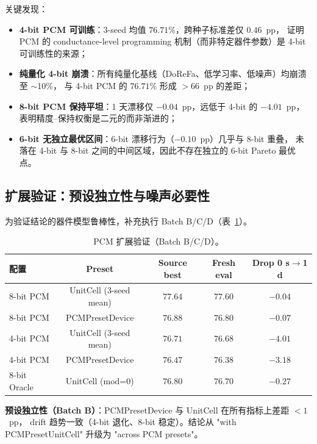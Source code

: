 关键发现：
\begin{itemize}
    \item \textbf{4-bit PCM 可训练}：3-seed 均值 $76.71\%$，跨种子标准差仅 $0.46$~pp，
    证明 PCM 的 conductance-level programming 机制（而非特定器件参数）是 4-bit 可训练性的来源；
    \item \textbf{纯量化 4-bit 崩溃}：所有纯量化基线（DoReFa、低学习率、低噪声）均崩溃至 $\sim$10\%，
    与 4-bit PCM 的 $76.71\%$ 形成 $>66$~pp 的差距；
    \item \textbf{8-bit PCM 保持平坦}：1 天漂移仅 $-0.04$~pp，远低于 4-bit 的 $-4.01$~pp，
    表明精度--保持权衡是二元的而非渐进的；
    \item \textbf{6-bit 无独立最优区间}：6-bit 漂移行为（$-0.10$~pp）几乎与 8-bit 重叠，
    未落在 4-bit 与 8-bit 之间的中间区域，因此不存在独立的 6-bit Pareto 最优点。
\end{itemize}

\subsection{扩展验证：预设独立性与噪声必要性}

为验证结论的器件模型鲁棒性，补充执行 Batch B/C/D（表~\ref{tab:pcm-extended}）。

\begin{table}[htbp]
\centering
\caption{PCM 扩展验证（Batch B/C/D）。}
\label{tab:pcm-extended}
\begin{tabular}{@{}lcccc@{}}
\toprule
\textbf{配置} & \textbf{Preset} & \textbf{Source best} & \textbf{Fresh eval} & \textbf{Drop 0 s$\to$1 d} \\
\midrule
8-bit PCM & UnitCell (3-seed mean) & $77.64$ & $77.60$ & $-0.04$ \\
8-bit PCM & PCMPresetDevice & $76.88$ & $76.80$ & $-0.07$ \\
4-bit PCM & UnitCell (3-seed mean) & $76.71$ & $76.68$ & $-4.01$ \\
4-bit PCM & PCMPresetDevice & $76.47$ & $76.38$ & $-3.18$ \\
8-bit Oracle & UnitCell (mod=0) & $76.80$ & $76.70$ & $-0.27$ \\
\bottomrule
\end{tabular}
\end{table}

\textbf{预设独立性（Batch B）}：PCMPresetDevice 与 UnitCell 在所有指标上差距 $<1$~pp，
drift 趋势一致（4-bit 退化、8-bit 稳定）。结论从 "with PCMPresetUnitCell" 升级为 "across PCM presets"。

